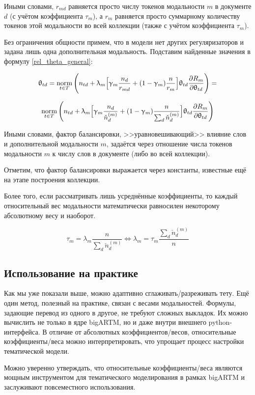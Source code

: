Иными словами, $r_{md}$ равняется просто числу токенов модальности $m$ в документе $d$ (с учётом коэффициента $\tau_m$), а $r_m$ равняется просто суммарному количеству токенов этой модальности во всей коллекции (также с учётом коэффициента $\tau_m$).

Без ограничения общности примем, что в модели нет других регуляризаторов и задана лишь одна дополнительная модальность. Подставим найденные значения в формулу \ref{rel_theta_general}:

\[
\uptheta_{td} = \mathop{\mathrm{norm}}\limits_{t \in T} \Bigg(
    n_{td} + \uplambda_m \Big[
        \upgamma_m \frac{n_d}{r_{md}} + (1-\upgamma_m)\frac{n}{r_m}
        \Big]
    \uptheta_{td} \frac{\partial R_m}{\partial \uptheta_{td}}
\Bigg) =
\]

\[
\mathop{\mathrm{norm}}\limits_{t \in T} \Bigg(
    n_{td} + \uplambda_m \Big[
        \upgamma_m \frac{n_d}{\check{n}_d^{(m)}} + (1-\upgamma_m)\frac{n}{\sum_d \check{n}_d^{(m)}}
        \Big]
    \uptheta_{td} \frac{\partial R_m}{\partial \uptheta_{td}}
\Bigg)
\]

Иными словами, фактор балансировки, >>уравновешивающий>> влияние слов и дополнительной модальности $m$, задаётся через отношение числа токенов модальности $m$ к числу слов в документе (либо во всей коллекции).

Отметим, что фактор балансировки выражается через константы, известные ещё на этапе построения коллекции.

Более того, если рассматривать лишь усреднённые коэффициенты, то каждый относительный вес модальности математически равносилен некоторому абсолютному весу и наоборот.

\[
\tau_m = \lambda_m \frac{n}{\sum_d \check{n}_d^{(m)}} \iff
\lambda_m = \tau_m \frac{\sum_d \check{n}_d^{(m)}}{n}
\]

\subsection{Использование на практике}

Как мы уже показали выше, можно адаптивно сглаживать/разреживать тету. Ещё один метод, полезный на практике, связан с весами модальностей.  Формулы, задающие перевод из одного в другое, не требуют сложных выкладок. Их можно вычислить не только в ядре bigARTM, но и даже внутри внешнего python-интерфейса.  В отличие от абсолютных коэффициентов/весов,  относительные коэффициенты/веса можно интерпретировать, что упрощает процесс настройки тематической модели.

Можно уверенно утверждать, что относительные коэффициенты/веса являются мощным инструментом для тематического моделирования в рамках bigARTM и заслуживают повсеместного использования.

